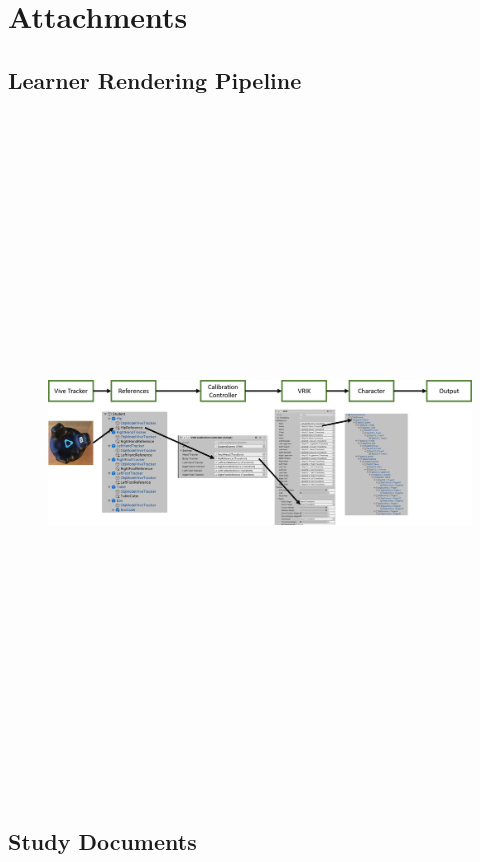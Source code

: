 \chapter{Attachments}

\section{Learner Rendering Pipeline}
\label{a:studentRenderingPipeline}
\begin{figure}[H]
	\includegraphics[angle=90,height=18cm]{figures/studentRenderingPipeline.png}
\end{figure}

\newpage
\section{Study Documents}
%